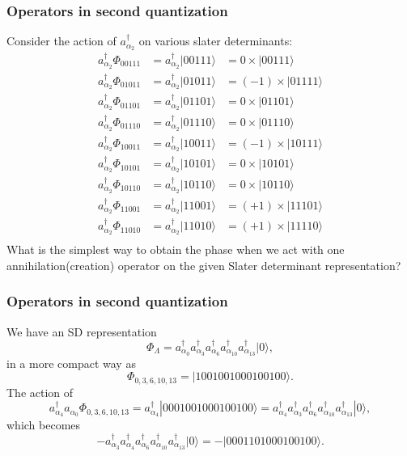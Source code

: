 \documentclass{beamer}
\begin{document}
\begin{frame}
\frametitle{Operators in second quantization}

\begin{block}{}
Consider the action of $a^{\dagger}_{\alpha_2}$ on various slater determinants:
\[
\begin{array}{ccc}
a^{\dagger}_{\alpha_2}\Phi_{00111}& = a^{\dagger}_{\alpha_2}|00111\rangle&=0\times |00111\rangle\\
a^{\dagger}_{\alpha_2}\Phi_{01011}& = a^{\dagger}_{\alpha_2}|01011\rangle&=(-1)\times |01111\rangle\\
a^{\dagger}_{\alpha_2}\Phi_{01101}& = a^{\dagger}_{\alpha_2}|01101\rangle&=0\times |01101\rangle\\
a^{\dagger}_{\alpha_2}\Phi_{01110}& = a^{\dagger}_{\alpha_2}|01110\rangle&=0\times |01110\rangle\\
a^{\dagger}_{\alpha_2}\Phi_{10011}& = a^{\dagger}_{\alpha_2}|10011\rangle&=(-1)\times |10111\rangle\\
a^{\dagger}_{\alpha_2}\Phi_{10101}& = a^{\dagger}_{\alpha_2}|10101\rangle&=0\times |10101\rangle\\
a^{\dagger}_{\alpha_2}\Phi_{10110}& = a^{\dagger}_{\alpha_2}|10110\rangle&=0\times |10110\rangle\\
a^{\dagger}_{\alpha_2}\Phi_{11001}& = a^{\dagger}_{\alpha_2}|11001\rangle&=(+1)\times |11101\rangle\\
a^{\dagger}_{\alpha_2}\Phi_{11010}& = a^{\dagger}_{\alpha_2}|11010\rangle&=(+1)\times |11110\rangle\\
\end{array}
\]
What is the simplest way to obtain the phase when we act with one annihilation(creation) operator
on the given Slater determinant representation?
\end{block}
\end{frame}

\begin{frame}
\frametitle{Operators in second quantization}

\begin{block}{}
We have an SD representation
\[
\Phi_{\Lambda} = a_{\alpha_0}^{\dagger} a_{\alpha_3}^{\dagger} a_{\alpha_6}^{\dagger} a_{\alpha_{10}}^{\dagger} a_{\alpha_{13}}^{\dagger} |0\rangle,
\]
in a more compact way as
\[
\Phi_{0,3,6,10,13} = |1001001000100100\rangle.
\]
The action of
\[
a^{\dagger}_{\alpha_4}a_{\alpha_0}\Phi_{0,3,6,10,13} = a^{\dagger}_{\alpha_4}|0001001000100100\rangle=a^{\dagger}_{\alpha_4}a_{\alpha_3}^{\dagger} a_{\alpha_6}^{\dagger} a_{\alpha_{10}}^{\dagger} a_{\alpha_{13}}^{\dagger} |0\rangle,
\]
which becomes
\[
-a_{\alpha_3}^{\dagger} a^{\dagger}_{\alpha_4} a_{\alpha_6}^{\dagger} a_{\alpha_{10}}^{\dagger} a_{\alpha_{13}}^{\dagger} |0\rangle=-|0001101000100100\rangle.
\]
\end{block}
\end{frame}
\end{document}
